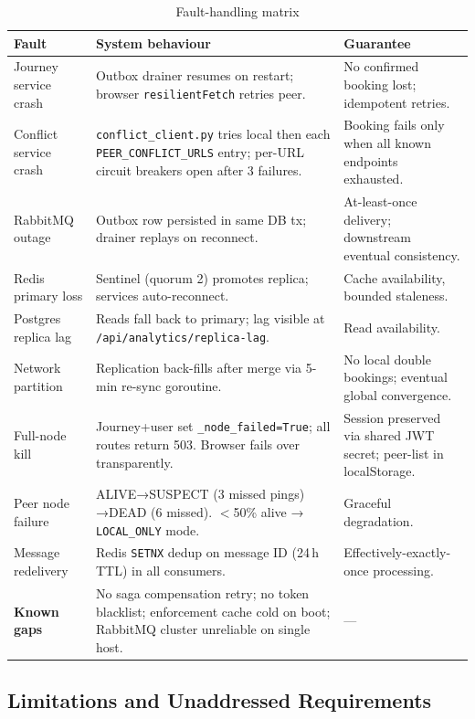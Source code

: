 \documentclass[11pt,a4paper]{article}
\begin{document}
\begin{table}[H]
\centering\footnotesize
\begin{tabularx}{\textwidth}{L{2.8cm} X L{3.8cm}}
  \toprule
  \textbf{Fault} & \textbf{System behaviour} & \textbf{Guarantee} \\
  \midrule
  Journey service crash & Outbox drainer resumes on restart; browser \texttt{resilientFetch} retries peer. & No confirmed booking lost; idempotent retries. \\
  Conflict service crash & \texttt{conflict\_client.py} tries local then each \texttt{PEER\_CONFLICT\_URLS} entry; per-URL circuit breakers open after 3 failures. & Booking fails only when all known endpoints exhausted. \\
  RabbitMQ outage & Outbox row persisted in same DB tx; drainer replays on reconnect. & At-least-once delivery; downstream eventual consistency. \\
  Redis primary loss & Sentinel (quorum 2) promotes replica; services auto-reconnect. & Cache availability, bounded staleness. \\
  Postgres replica lag & Reads fall back to primary; lag visible at \texttt{/api/analytics/replica-lag}. & Read availability. \\
  Network partition & Replication back-fills after merge via 5-min re-sync goroutine. & No local double bookings; eventual global convergence. \\
  Full-node kill & Journey+user set \texttt{\_node\_failed=True}; all routes return 503. Browser fails over transparently. & Session preserved via shared JWT secret; peer-list in localStorage. \\
  Peer node failure & ALIVE→SUSPECT (3 missed pings) →DEAD (6 missed). $<$50\% alive → \texttt{LOCAL\_ONLY} mode. & Graceful degradation. \\
  Message redelivery & Redis \texttt{SETNX} dedup on message ID (24\,h TTL) in all consumers. & Effectively-exactly-once processing. \\
  \textbf{Known gaps} & No saga compensation retry; no token blacklist; enforcement cache cold on boot; RabbitMQ cluster unreliable on single host. & --- \\
  \bottomrule
\end{tabularx}
\caption{Fault-handling matrix}
\label{tab:faults}
\end{table}

\subsection{Limitations and Unaddressed Requirements}
\label{sec:limitations}
\end{document}
